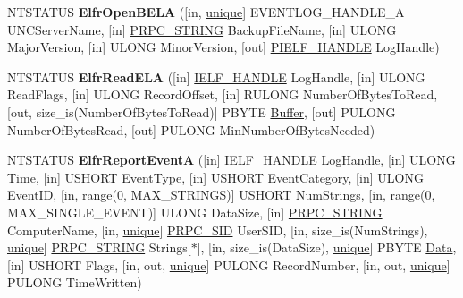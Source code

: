\begin{DoxyCompactItemize}
N\+T\+S\+T\+A\+T\+US {\bfseries Elfr\+Open\+B\+E\+LA} (\mbox{[}in, \hyperlink{interfaceunique}{unique}\mbox{]} E\+V\+E\+N\+T\+L\+O\+G\+\_\+\+H\+A\+N\+D\+L\+E\+\_\+A U\+N\+C\+Server\+Name, \mbox{[}in\mbox{]} \hyperlink{struct___r_p_c___s_t_r_i_n_g}{P\+R\+P\+C\+\_\+\+S\+T\+R\+I\+NG} Backup\+File\+Name, \mbox{[}in\mbox{]} U\+L\+O\+NG Major\+Version, \mbox{[}in\mbox{]} U\+L\+O\+NG Minor\+Version, \mbox{[}out\mbox{]} \hyperlink{interfacevoid}{P\+I\+E\+L\+F\+\_\+\+H\+A\+N\+D\+LE} Log\+Handle)
\item 
\mbox{\label{interfaceeventlog_afe6271e2353824e183e8f388866bfdee}} 
N\+T\+S\+T\+A\+T\+US {\bfseries Elfr\+Read\+E\+LA} (\mbox{[}in\mbox{]} \hyperlink{interfacevoid}{I\+E\+L\+F\+\_\+\+H\+A\+N\+D\+LE} Log\+Handle, \mbox{[}in\mbox{]} U\+L\+O\+NG Read\+Flags, \mbox{[}in\mbox{]} U\+L\+O\+NG Record\+Offset, \mbox{[}in\mbox{]} R\+U\+L\+O\+NG Number\+Of\+Bytes\+To\+Read, \mbox{[}out, size\+\_\+is(Number\+Of\+Bytes\+To\+Read)\mbox{]} P\+B\+Y\+TE \hyperlink{class_buffer}{Buffer}, \mbox{[}out\mbox{]} P\+U\+L\+O\+NG Number\+Of\+Bytes\+Read, \mbox{[}out\mbox{]} P\+U\+L\+O\+NG Min\+Number\+Of\+Bytes\+Needed)
\item 
\mbox{\label{interfaceeventlog_af9c79bcc595e9c4f81d56ac0f31f03e8}} 
N\+T\+S\+T\+A\+T\+US {\bfseries Elfr\+Report\+EventA} (\mbox{[}in\mbox{]} \hyperlink{interfacevoid}{I\+E\+L\+F\+\_\+\+H\+A\+N\+D\+LE} Log\+Handle, \mbox{[}in\mbox{]} U\+L\+O\+NG Time, \mbox{[}in\mbox{]} U\+S\+H\+O\+RT Event\+Type, \mbox{[}in\mbox{]} U\+S\+H\+O\+RT Event\+Category, \mbox{[}in\mbox{]} U\+L\+O\+NG Event\+ID, \mbox{[}in, range(0, M\+A\+X\+\_\+\+S\+T\+R\+I\+N\+GS)\mbox{]} U\+S\+H\+O\+RT Num\+Strings, \mbox{[}in, range(0, M\+A\+X\+\_\+\+S\+I\+N\+G\+L\+E\+\_\+\+E\+V\+E\+NT)\mbox{]} U\+L\+O\+NG Data\+Size, \mbox{[}in\mbox{]} \hyperlink{struct___r_p_c___s_t_r_i_n_g}{P\+R\+P\+C\+\_\+\+S\+T\+R\+I\+NG} Computer\+Name, \mbox{[}in, \hyperlink{interfaceunique}{unique}\mbox{]} \hyperlink{struct___r_p_c___s_i_d}{P\+R\+P\+C\+\_\+\+S\+ID} User\+S\+ID, \mbox{[}in, size\+\_\+is(Num\+Strings), \hyperlink{interfaceunique}{unique}\mbox{]} \hyperlink{struct___r_p_c___s_t_r_i_n_g}{P\+R\+P\+C\+\_\+\+S\+T\+R\+I\+NG} Strings\mbox{[}$\ast$\mbox{]}, \mbox{[}in, size\+\_\+is(Data\+Size), \hyperlink{interfaceunique}{unique}\mbox{]} P\+B\+Y\+TE \hyperlink{struct_data}{Data}, \mbox{[}in\mbox{]} U\+S\+H\+O\+RT Flags, \mbox{[}in, out, \hyperlink{interfaceunique}{unique}\mbox{]} P\+U\+L\+O\+NG Record\+Number, \mbox{[}in, out, \hyperlink{interfaceunique}{unique}\mbox{]} P\+U\+L\+O\+NG Time\+Written)

\end{DoxyCompactItemize}
